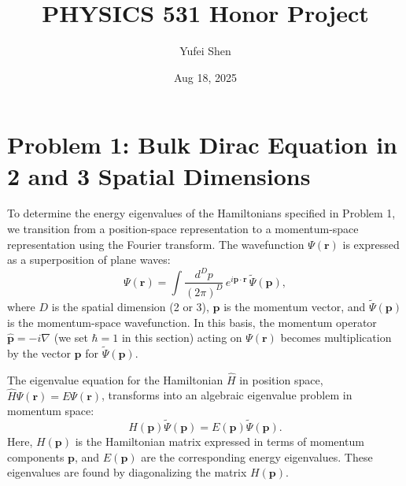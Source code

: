 \documentclass{article}
\title{PHYSICS 531 Honor Project}
\author{Yufei Shen}
\date{Aug 18, 2025}
\begin{document}
    \maketitle
    \section{Problem 1: Bulk Dirac Equation in 2 and 3 Spatial Dimensions}

    To determine the energy eigenvalues of the Hamiltonians specified in Problem 1, we transition from a position-space representation to a momentum-space representation using the Fourier transform. The wavefunction $\Psi(\mathbf{r})$ is expressed as a superposition of plane waves:
    \begin{equation}
        \Psi(\mathbf{r}) = \int \frac{d^D p}{(2\pi)^D}\, e^{i\mathbf{p}\cdot \mathbf{r}}\, \tilde{\Psi}(\mathbf{p}),
    \end{equation}
    where $D$ is the spatial dimension (2 or 3), $\mathbf{p}$ is the momentum vector, and $\tilde{\Psi}(\mathbf{p})$ is the momentum-space wavefunction. In this basis, the momentum operator $\hat{\mathbf{p}} = -i\nabla$ (we set $\hbar=1$ in this section) acting on $\Psi(\mathbf{r})$ becomes multiplication by the vector $\mathbf{p}$ for $\tilde{\Psi}(\mathbf{p})$.

    The eigenvalue equation for the Hamiltonian $\hat{H}$ in position space, $\hat{H}\Psi(\mathbf{r}) = E\Psi(\mathbf{r})$, transforms into an algebraic eigenvalue problem in momentum space:
    \begin{equation}
        H(\mathbf{p})\tilde{\Psi}(\mathbf{p}) = E(\mathbf{p})\tilde{\Psi}(\mathbf{p}).
    \end{equation}
    Here, $H(\mathbf{p})$ is the Hamiltonian matrix expressed in terms of momentum components $\mathbf{p}$, and $E(\mathbf{p})$ are the corresponding energy eigenvalues. These eigenvalues are found by diagonalizing the matrix $H(\mathbf{p})$.
\end{document}
